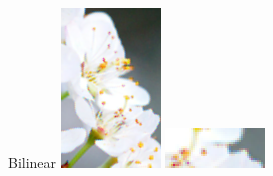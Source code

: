 \begin{figure}[H]
\begin{minipage}{0.19\textwidth}
    \end{minipage}
    \hfill
    \begin{minipage}{0.19\textwidth}
        \centering
        Bilinear 
        \includegraphics[width=\textwidth]{img/flower/flower-bilinear.png}
        \includegraphics[width=\textwidth]{img/flower/flower-close-bilinear.png}

\end{minipage}
\end{figure}
